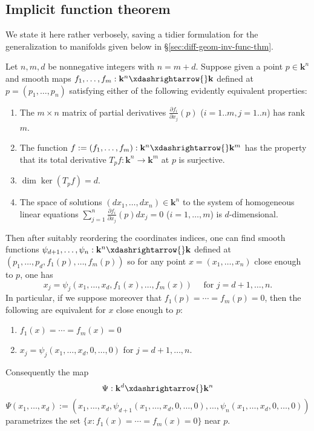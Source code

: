\documentclass[reqno]{amsart} 
\begin{document}
\subsection{Implicit function theorem\label{sec:calc-impl-func-thm}}
\label{sec:orgc7b25df}
We state it here rather verbosely, saving a tidier formulation
for the generalization to manifolds given below in \S\ref{sec:diff-geom-inv-func-thm}.
\begin{theorem}\label{thm:implicit-function-thm-euclidean}
  Let $n,m,d$ be nonnegative integers with $n = m + d$.  Suppose
  given a point $p \in \mathbf{k}^n$ and smooth maps
  $f_1,\dotsc,f_m : \mathbf{k}^n \xdashrightarrow{} \mathbf{k}$
  defined at $p = (p_1,\dotsc,p_n)$ satisfying
  either of the following evidently equivalent properties:
  \begin{enumerate}
  \item The
    $m \times n$ matrix of partial derivatives
    $\frac{\partial f_i}{\partial x_j}(p)$ ($i=1..m, j = 1..n$) has
    rank $m$.
  \item
    The function $f := (f_1,\dotsc,f_m) : \mathbf{k}^n
    \xdashrightarrow{} \mathbf{k}^m$
    has the property that its total derivative $T_p f : \mathbf{k}^n
    \rightarrow \mathbf{k}^m$ at $p$ is surjective.
  \item $\dim \ker(T_p f) = d$.
  \item The space of solutions
    $(d x_1,\dotsc, d x_n) \in \mathbf{k}^n$
    to the system of homogeneous linear equations
    $\sum_{j=1}^n \frac{\partial f_i}{\partial x_j} (p) d x _j = 0$
    ($i=1,\dotsc,m$)
    is $d$-dimensional.
  \end{enumerate}
  Then after suitably reordering the
  coordinates
  indices, one can find smooth functions
  $\psi_{d+1}, \dotsc, \psi_{n} : \mathbf{k}^n \xdashrightarrow{}
  \mathbf{k}$
  defined at 
  $(p_1,\dotsc,p_d,f_1(p),\dotsc,f_m(p))$
  so for any point $x = (x_1,\dotsc,x_n)$ close
  enough to $p$,
  one has
  \begin{equation*}
  x_j
  =
  \psi_j(x_1,\dotsc,x_d,f_1(x),\dotsc,f_m(x))
  \quad \text{ for } j = d+1,\dotsc,n.
  \end{equation*}
  In particular, if we suppose moreover
  that $f_1(p) = \dotsb = f_m(p) = 0$,
  then the following are equivalent
  for $x$ close enough to $p$:
  \begin{enumerate}
  \item $f_1(x) = \dotsb = f_m(x) = 0$
  \item $x_j = \psi_j(x_1,\dotsc,x_d,0,\dotsc,0)$ for $j = d+1, \dotsc, n$.
  \end{enumerate}
  Consequently the map
  \begin{equation*}
\Psi : \mathbf{k}^d \xdashrightarrow{} \mathbf{k}^n
\end{equation*}
  \begin{equation*}
\Psi(x_1,\dotsc,x_d) :=
  (x_1,\dotsc,x_d,\psi_{d+1}(x_1,\dotsc,x_d,0,\dotsc,0),
  \dotsc,
  \psi_{n}(x_1,\dotsc,x_d,0,\dotsc,0))
\end{equation*}
  parametrizes the set $\{ x : f_1(x) = \dotsb = f_m(x) = 0\}$ near $p$.
\end{theorem}
\end{document}
